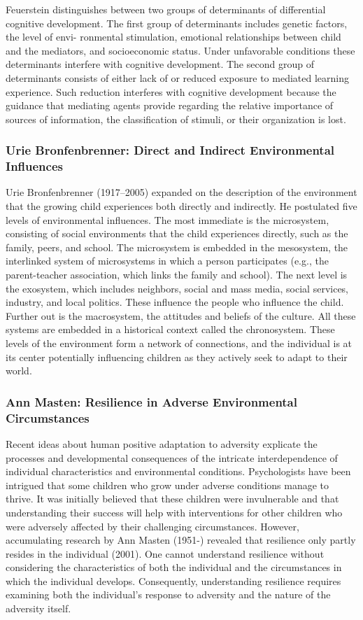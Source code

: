 Feuerstein distinguishes between two groups of determinants of differential
cognitive development. The first group of determinants includes genetic
factors, the level of envi- ronmental stimulation, emotional relationships
between child and the mediators, and socioeconomic status. Under unfavorable
conditions these determinants interfere with cognitive development. The second
group of determinants consists of either lack of or reduced exposure to 
mediated learning experience. Such reduction interferes with cognitive
development because the guidance that mediating agents provide regarding the
relative importance of sources of information, the classification of stimuli,
or their organization is lost. \cite{Feldman3}

\subsubsection{Urie Bronfenbrenner: Direct and Indirect Environmental Influences}
Urie Bronfenbrenner (1917–2005) expanded on the description of the environment
that the growing child experiences both directly and indirectly. He postulated
five levels of environmental influences. The most immediate is the microsystem,
consisting of social environments that the child experiences directly, such as
the family, peers, and school. The microsystem is embedded in the mesosystem,
the interlinked system of microsystems in which a person participates
(e.g., the parent-teacher association, which links the family and school). The
next level is the exosystem, which includes neighbors, social and mass media,
social services, industry, and local politics. These influence the people who
influence the child. Further out is the macrosystem, the attitudes and beliefs
of the culture. All these systems are embedded in a historical context called
the chronosystem. These levels of the environment form a network of
connections, and the individual is at its center potentially influencing
children as they actively seek to adapt to their world. \cite{Feldman3}

\subsubsection{Ann Masten: Resilience in Adverse Environmental Circumstances}
Recent ideas about human positive adaptation to adversity explicate the
processes and developmental consequences of the intricate interdependence of
individual characteristics and environmental conditions. Psychologists have
been intrigued that some children who grow under adverse conditions manage to
thrive. It was initially believed that these children were invulnerable and
that understanding their success will help with interventions for other
children who were adversely affected by their challenging circumstances.
However, accumulating research by Ann Masten (1951-) revealed that resilience
only partly resides in the individual (2001). One cannot understand resilience
without considering the characteristics of both the individual and the
circumstances in which the individual develops. Consequently, understanding
resilience requires examining both the individual’s response to adversity and
the nature of the adversity itself. \cite{Feldman3}

